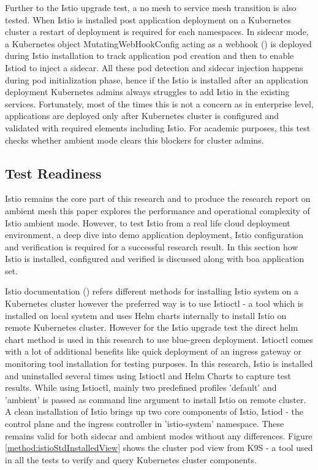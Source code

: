 Further to the Istio upgrade test, a no mesh to service mesh transition is also tested. When Istio is installed post application deployment on a Kubernetes cluster a restart of deployment is required for each namespaces. In sidecar mode, a Kubernetes object MutatingWebHookConfig acting as a webhook (\cite{krochmalski2017docker}) is deployed during Istio installation to track application pod creation and then to enable Istiod to inject a sidecar. All these pod detection and sidecar injection happens during pod initialization phase, hence if the Istio is installed after an application deployment Kubernetes admins always struggles to add Istio in the existing services. Fortunately, most of the times this is not a concern as in enterprise level, applications are deployed only after Kubernetes cluster is configured and validated with required elements including Istio. For academic purposes, this test checks whether ambient mode clears this blockers for cluster admins.

\subsection{Test Readiness}
\label{testReadiness}
Istio remains the core part of this research and to produce the research report on ambient mesh this paper explores the performance and operational complexity of Istio ambient mode. However, to test Istio from a real life cloud deployment environment, a deep dive into demo application deployment, Istio configuration and verification is required for a successful research result. In this section how Istio is installed, configured and verified is discussed along with \acrshort{boa} application set.

Istio documentation (\cite{istioDocInstall}) refers different methods for installing Istio system on a Kubernetes cluster however the preferred way is to use Istioctl - a tool which is installed on local system and uses Helm charts internally to install Istio on remote Kubernetes cluster. However for the Istio upgrade test the direct helm chart method is used in this research to use blue-green deployment. Istioctl comes with a lot of additional benefits like quick deployment of an ingress gateway or monitoring tool installation for testing purposes. In this research, Istio is installed and uninstalled several times using Istioctl and Helm Charts to capture test results. While using Istioctl, mainly two predefined profiles 'default' and 'ambient' is passed as command line argument to install Istio on remote cluster. A clean installation of Istio brings up two core components of Istio, Istiod - the control plane and the ingress controller in 'istio-system' namespace. These remains valid for both sidecar and ambient modes without any differences. Figure \ref{method:istioStdInstalledView} shows the cluster pod view from K9S - a tool used in all the tests to verify and query Kubernetes cluster components.


